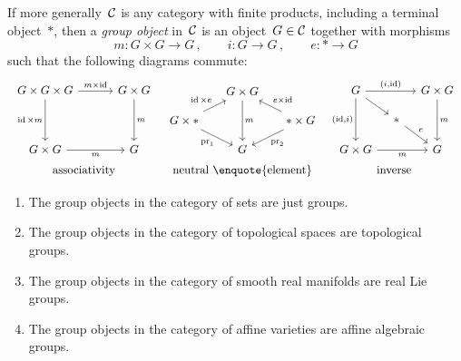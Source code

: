 \begin{remark}
  If more generally~$\mathcal{C}$ is any category with finite products, including a terminal object~$\ast$, then a \emph{group object} in~$\mathcal{C}$ is an object~$G \in \mathcal{C}$ together with morphisms
  \[
    m \colon G \times G \to G \,,
    \qquad
    i \colon G \to G \,,
    \qquad
    e \colon \ast \to G
  \]
  such that the following diagrams commute:
  \[
    \renewcommand{\arraystretch}{1.5}
    \renewcommand{\arraycolsep}{4pt}
    \begin{array}{ccc}
        \begin{tikzcd}[row sep = 36pt, column sep = 30pt]
            G \times G \times G
            \arrow{r}[above]{m \times \id}
            \arrow{d}[left]{\id \times m}
          & G \times G
            \arrow{d}[right]{m}
          \\
            G \times G
            \arrow{r}[below]{m}
          & G
        \end{tikzcd}
      &
        \begin{tikzcd}[row sep = 10pt, column sep = 15pt]
            {}
          & G \times G
            \arrow{dd}[right]{m}
          & {}
          \\
            G \times *
            \arrow{ur}[above left]{\id \times e}
            \arrow{dr}[below left]{\pr_1}
          & {}
          & * \times G
            \arrow{ul}[above right]{e \times \id}
            \arrow{dl}[below right]{\pr_2}
          \\
            {}
          & G
          & {}
        \end{tikzcd}
      &
        \begin{tikzcd}[row sep = 12pt, column sep = 10pt]
            G
            \arrow{rr}[above]{(i,\id)}
            \arrow{dd}[left]{(\id,i)}
            \arrow{dr}
          & {}
          & G \times G
            \arrow{dd}[right]{m}
          \\
            {}
          & *
            \arrow{dr}{e}
          & {}
          \\
            G \times G
            \arrow{rr}[below]{m}
          & {}
          & G
        \end{tikzcd}
    \\
        \text{associativity}
      & \text{neutral \enquote{element}}
      & \text{inverse}
    \end{array}
  \]
\end{remark}


\begin{example}
  \leavevmode
  \begin{enumerate}
    \item
      The group objects in the category of sets are just groups.
    \item
      The group objects in the category of topological spaces are topological groups.
    \item
      The group objects in the category of smooth real manifolds are real Lie groups.
    \item
      The group objects in the category of affine varieties are affine algebraic groups.
  \end{enumerate}
\end{example}



